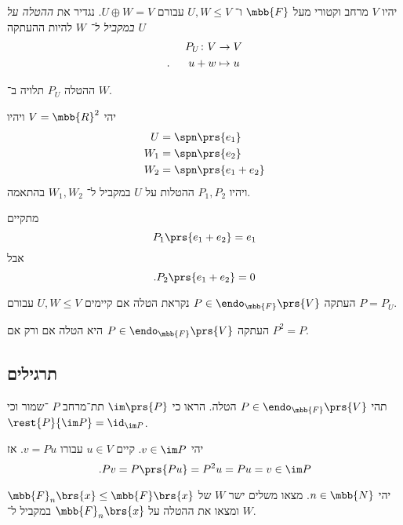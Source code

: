 \documentclass[a4paper,10pt,oneside,openany]{article}
\begin{document}
\begin{definition}
יהיו
$V$
מרחב וקטורי מעל
$\mbb{F}$
ו־%
$U,W \leq V$
עבורם
$U \oplus W = V$.
נגדיר את
\emph{ההטלה על
$U$
במקביל ל־%
$W$}
להיות ההעתקה
\begin{align*}
P_U \colon V &\to V \\
\text{.} \hphantom{lala} u+w &\mapsto u
\end{align*}
\end{definition}

\begin{remark}
ההטלה
$P_U$
תלויה ב־%
$W$.
\end{remark}

\begin{example}
יהי
$V = \mbb{R}^2$
ויהיו
\begin{align*}
U &= \spn\prs{e_1} \\
W_1 &= \spn\prs{e_2} \\
W_2 &= \spn\prs{e_1 + e_2}
\end{align*}
ויהיו
$P_1, P_2$
ההטלות על
$U$
במקביל ל־%
$W_1, W_2$
בהתאמה.

מתקיים
\[P_1 \prs{e_1 + e_2} = e_1\]
אבל
\[\text{.} P_2 \prs{e_1 + e_2} = 0\]
\end{example}

\begin{definition}[הטלה]
העתקה
$P \in \endo_{\mbb{F}}\prs{V}$
נקראת הטלה אם קיימים
$U,W \leq V$
עבורם
$P = P_U$.
\end{definition}

\begin{fact}
העתקה
$P \in \endo_{\mbb{F}}\prs{V}$
היא הטלה אם ורק אם
$P^2 = P$.
\end{fact}

\subsection{תרגילים}

\begin{exercise}
תהי
$P \in \endo_{\mbb{F}}\prs{V}$
הטלה.
הראו כי
$\im\prs{P}$
תת־מרחב
$P$%
־שמור וכי
$\rest{P}{\im P} = \id_{\im P}$.
\end{exercise}

\begin{solution}
יהי
$v \in \im P$.
קיים
$u \in V$
עבורו
$v = Pu$.
אז
\[\text{.} Pv = P\prs{P u} = P^2 u = Pu = v \in \im P\]
\end{solution}

\begin{exercise}
יהי
$n \in \mbb{N}$.
מצאו משלים ישר
$W$
של
$\mbb{F}_n\brs{x} \leq \mbb{F}\brs{x}$
ומצאו את ההטלה על
$\mbb{F}_n\brs{x}$
במקביל ל־%
$W$.
\end{exercise}
\end{document}
